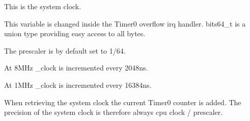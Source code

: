 This is the system clock. 

This variable is changed inside the {\ttfamily Timer0} overflow irq handler. {\ttfamily bits64\+\_\+t} is a union type providing easy access to all bytes.

The prescaler is by default set to 1/64.
\begin{DoxyItemize}
\item At 8\+M\+Hz \+\_\+clock is incremented every 2\textquotesingle{}048ns.
\item At 1\+M\+Hz \+\_\+clock is incremented every 16\textquotesingle{}384ns.
\end{DoxyItemize}

When retrieving the system clock the current {\ttfamily Timer0} counter is added. The precision of the system clock is therefore always cpu clock / prescaler. 